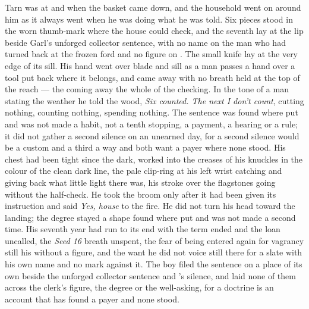 \scenebreak

Tarn was at  and  when the basket came down, and the household went on around him as it always went when he was doing what he was told. Six pieces stood in the worn thumb-mark where the house could check, and the seventh lay at the lip beside Garl's unforged collector sentence, with no name on the man who had turned back at the frozen ford and no figure on . The small knife lay at the very edge of its sill. His hand went over blade and sill as a man passes a hand over a tool put back where it belongs, and came away with no breath held at the top of the reach --- the coming away the whole of the checking. In the tone of a man stating the weather he told the wood, \emph{Six counted. The next I don't count}, cutting nothing, counting nothing, spending nothing. The sentence was found where put and was not made a habit, not a tenth stopping, a payment, a hearing or a rule; it did not gather a second silence on an unearned day, for a second silence would be a custom and a third a way and both want a payer where none stood. His chest had been tight since the dark,  worked into the creases of his knuckles in the colour of the clean dark line, the pale clip-ring at his left wrist catching and giving back what little light there was, his stroke over the flagstones going without the half-check. He took the broom only after it had been given its instruction and said \emph{Yes, house} to the fire. He did not turn his head toward the landing; the degree stayed a shape found where put and was not made a second time. His seventh year had run to its end with the term ended and the loan uncalled, the \emph{Seed 16} breath unspent, the fear of being entered again for vagrancy still his without a figure, and the want he did not voice still there for a slate with his own name and no mark against it. The boy filed the sentence on a place of its own beside the unforged collector sentence and 's silence, and laid none of them across the clerk's figure, the degree or the well-asking, for a doctrine is an account that has found a payer and none stood.

